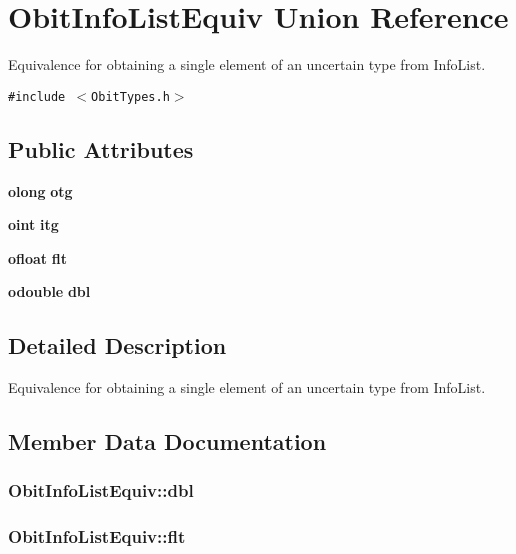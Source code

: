 \section{Obit\-Info\-List\-Equiv Union Reference}
\label{unionObitInfoListEquiv}
Equivalence for obtaining a single element of an uncertain type from Info\-List.  


{\tt \#include $<$Obit\-Types.h$>$}

\subsection*{Public Attributes}
\begin{CompactItemize}
\item 
{\bf olong} {\bf otg}
\item 
{\bf oint} {\bf itg}
\item 
{\bf ofloat} {\bf flt}
\item 
{\bf odouble} {\bf dbl}
\end{CompactItemize}


\subsection{Detailed Description}
Equivalence for obtaining a single element of an uncertain type from Info\-List. 



\subsection{Member Data Documentation}
\subsubsection{ {\bf Obit\-Info\-List\-Equiv::dbl}}\label{unionObitInfoListEquiv_o3}


\subsubsection{ {\bf Obit\-Info\-List\-Equiv::flt}}\label{unionObitInfoListEquiv_o2}


